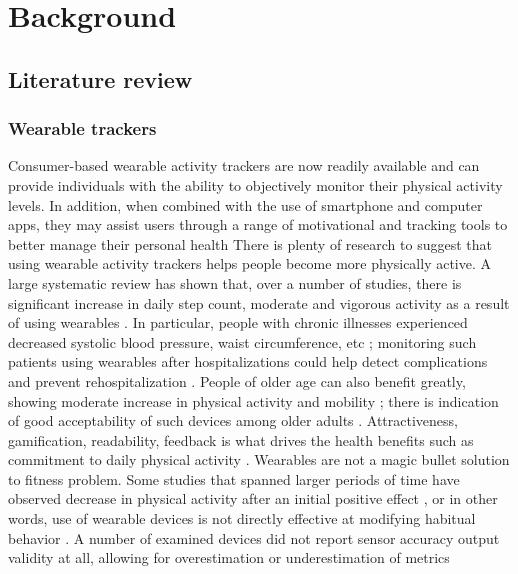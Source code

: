 \chapter{Background}
\label{cha:background}
\section{Literature review}
\subsection{Wearable trackers}
Consumer-based wearable activity trackers are now readily available and can provide individuals with the ability to objectively monitor their physical activity levels. In addition, when combined with the use of smartphone and computer apps, they may assist users through a range of motivational and tracking tools to better manage their personal health \cite{trackersBenefitGeneral}
There is plenty of research to suggest that using wearable activity trackers helps people become more physically active. A large systematic review has shown that, over a number of studies, there is significant increase in daily step count, moderate and vigorous activity as a result of using wearables \cite{trackersBenefitGeneral}. In particular, people with chronic illnesses experienced decreased systolic blood pressure, waist circumference, etc \cite {Franssen2020}; monitoring such patients using wearables after hospitalizations could help detect complications and prevent rehospitalization \cite{hospi}. People of older age can also benefit greatly, showing moderate increase in physical activity and mobility \cite{SOliveira1188}; there is indication of good acceptability of such devices among older adults \cite {Franssen2020}. Attractiveness, gamification, readability, feedback is what drives the health benefits such as commitment to daily physical activity \cite{NELSON2016364}. Wearables are not a magic bullet solution to fitness problem. Some studies that spanned larger periods of time have observed decrease in physical activity after an initial positive effect \cite{Finkelstein2016}, or in other words, use of wearable devices is not directly effective at modifying habitual behavior \cite{LI2021104487}. A number of examined devices did not report sensor accuracy output validity at all, allowing for overestimation or underestimation of metrics \cite{Lee2014ActivityTA}
